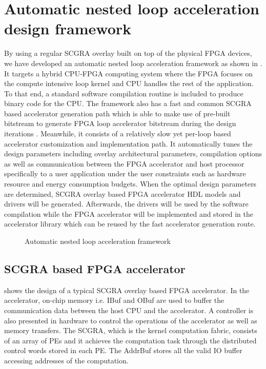 \section{Automatic nested loop acceleration design framework} \label{sec:acc-framework}
By using a regular SCGRA overlay built on top of the physical FPGA devices, 
we have developed an automatic nested loop acceleration framework 
as shown in . It targets a hybrid CPU-FPGA
computing system where the FPGA focuses on the compute intensive loop kernel and CPU handles the
rest of the application. To that end, a standard software compilation routine is included to
produce binary code for the CPU. The framework also has a fast and common SCGRA based accelerator
generation path which is able to make use of pre-built bitstream to generate FPGA
loop accelerator bitstream during the design iterations \cite{scgra}. Meanwhile, it consists of a
relatively slow yet per-loop based accelerator customization and implementation path. It
automatically tunes the design parameters 
including overlay architectural parameters, compilation options as well as communication between the
FPGA accelerator and host processor specifically to a user application under the user constraints
such as hardware resource and energy consumption budgets. When the optimal design 
parameters are determined, SCGRA overlay based FPGA accelerator HDL models and drivers will be
generated. Afterwards, the drivers will be used by the software compilation while the FPGA
accelerator will be implemented and stored in the accelerator library which can be reused by the
fast accelerator generation route.

\begin{figure}[tb]
\caption{Automatic nested loop acceleration framework}
\label{fig:framework}
\end{figure}

\subsection{SCGRA based FPGA accelerator}
 shows the design of a typical SCGRA overlay 
based FPGA accelerator. In the accelerator, on-chip
memory i.e. IBuf and OBuf are used to buffer the communication 
data between the host CPU and 
the accelerator. A controller is also presented in hardware 
to control the operations of the accelerator as well as
memory transfers. The SCGRA, which is the kernel computation fabric,
consists of an array of PEs and it achieves the computation 
task through the distributed control words stored in each PE. The AddrBuf 
stores all the valid IO buffer accessing addresses of the computation. 

